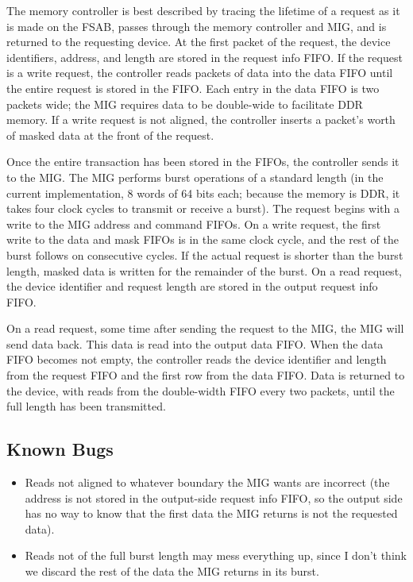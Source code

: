 \documentclass[10pt]{report}
\begin{document}
The memory controller is best described by tracing the lifetime of a request
as it is made on the FSAB, passes through the memory controller and MIG, and
is returned to the requesting device. At the first packet of the request,
the device identifiers, address, and length are stored in the request info
FIFO. If the request is a write request, the controller reads packets of
data into the data FIFO until the entire request is stored in the FIFO. Each
entry in the data FIFO is two packets wide; the MIG requires data to be
double-wide to facilitate DDR memory. If a write request is not aligned, the
controller inserts a packet's worth of masked data at the front of the
request.

Once the entire transaction has been stored in the FIFOs, the controller
sends it to the MIG. The MIG performs burst operations of a standard length
(in the current implementation, 8 words of 64 bits each; because the memory
is DDR, it takes four clock cycles to transmit or receive a burst). The
request begins with a write to the MIG address and command FIFOs. On a write
request, the first write to the data and mask FIFOs is in the same clock
cycle, and the rest of the burst follows on consecutive cycles. If the
actual request is shorter than the burst length, masked data is written for
the remainder of the burst. On a read request, the device identifier and
request length are stored in the output request info FIFO.

On a read request, some time after sending the request to the MIG, the MIG
will send data back. This data is read into the output data FIFO. When the
data FIFO becomes not empty, the controller reads the device identifier and
length from the request FIFO and the first row from the data FIFO. Data is
returned to the device, with reads from the double-width FIFO every two
packets, until the full length has been transmitted.

\subsection{Known Bugs}

\begin{itemize}
\item{Reads not aligned to whatever boundary the MIG wants are incorrect
(the address is not stored in the output-side request info FIFO, so the
output side has no way to know that the first data the MIG returns is not
the requested data).}
\item{Reads not of the full burst length may mess everything up, since I
don't think we discard the rest of the data the MIG returns in its burst.}
\end{itemize}
\end{document}
